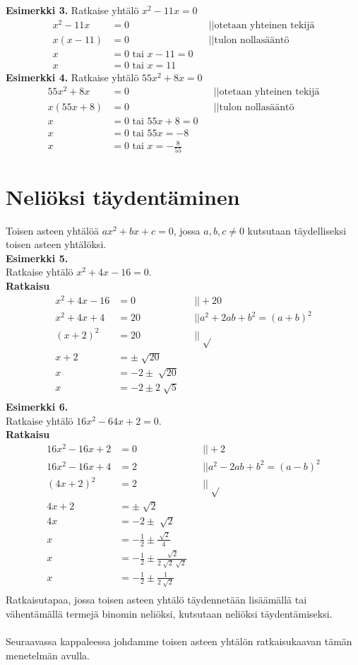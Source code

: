 \textbf{Esimerkki 3.}
Ratkaise yhtälö $x^2-11x=0$
\begin{align*}
x^2-11x&=0 \ \ \ \ \  &&||\text{otetaan yhteinen tekijä} \\
x(x-11)&=0 \ \ \ \ \ &&||\text{tulon nollasääntö} \\
x&=0 \text{ tai } x-11=0 \\ 
x&=0 \text{ tai } x=11
\end{align*} 
\textbf{Esimerkki 4.}
Ratkaise yhtälö $55x^2+8x=0$
\begin{align*}
55x^2+8x&=0 \ \ \ \ \ &&||\text{otetaan yhteinen tekijä} \\
x(55x+8)&=0 \ \ \ \ \ &&||\text{tulon nollasääntö} \\
x&=0 \text{ tai } 55x+8=0 \\
x&=0 \text{ tai } 55x=-8 \\
x&=0 \text{ tai } x=-\frac{8}{55}
\end{align*}
\section{Neliöksi täydentäminen}
Toisen asteen yhtälöä $ax^2+bx+c=0$, jossa $a,b,c \neq 0$ kutsutaan täydelliseksi toisen asteen yhtälöksi. \\ 
\textbf{Esimerkki 5.} \\
Ratkaise yhtälö $x^2+4x-16=0$. \\
\textbf{Ratkaisu} 
\begin{align*}
x^2+4x-16&=0 \ \ \ \ \ &&||+20 \\
x^2+4x+4&=20 \ \ \ \ \ &&||a^2+2ab+b^2=(a+b)^2 \\
(x+2)^2&=20 \ \ \ \ \ &&||\sqrt[]{} \\
x+2 &= \pm \sqrt[]{20} \\
x&=-2 \pm \sqrt[]{20} \\
x&=-2 \pm 2 \sqrt[]{5} \\
\end{align*}
\textbf{Esimerkki 6.} \\
Ratkaise yhtälö $16x^2-64x+2=0$. \\
\textbf{Ratkaisu} 
\begin{align*}
16x^2-16x+2&=0 \ \ \ \ \ &&||+2 \\
16x^2-16x+4&=2 \ \ \ \ \ &&||a^2-2ab+b^2=(a-b)^2 \\
(4x+2)^2&=2 \ \ \ \ \ &&|| \sqrt[]{} \\
4x+2&=\pm \sqrt[]{2} \\
4x&=-2 \pm \sqrt[]{2} \\
x&=-\frac{1}{2} \pm \frac{\sqrt[]{2}}{4} \\
x&=-\frac{1}{2} \pm \frac{\sqrt[]{2}}{ 2\sqrt[]{2}\sqrt[]{2}} \\
x&=-\frac{1}{2} \pm \frac{1}{2 \sqrt[]{2}} \\
\end{align*}
Ratkaisutapaa, jossa toisen asteen yhtälö täydennetään lisäämällä tai vähentämällä termejä binomin neliöksi, kutsutaan neliöksi täydentämiseksi. \\
 \\
Seuraavassa kappaleessa johdamme toisen asteen yhtälön ratkaisukaavan tämän menetelmän avulla.
